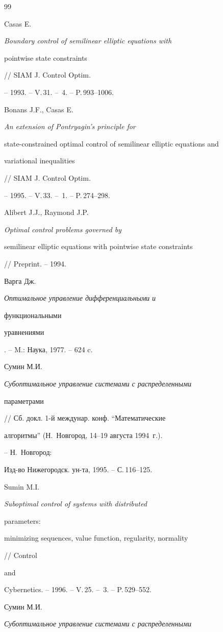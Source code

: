 \begin{thebibliography}{99}


Casas E. {\em Boundary control of semilinear elliptic equations with 


pointwise state constraints} // SIAM J. Control Optim. 


-- 1993. -- V.\,31. -- \No\,4. -- P.\,993--1006. 




Bonans J.F., Casas E. {\em An extension of Pontryagin's principle for 


state-constrained optimal control of semilinear elliptic equations and 


variational inequalities} // SIAM J. Control Optim. 


-- 1995. -- V.\,33. -- \No\,1. -- P.\,274--298. 




Alibert J.J., Raymond J.P. {\em Optimal control problems governed by 


semilinear elliptic equations with pointwise state constraints} 


// Preprint. -- 1994. 




Варга Дж. {\em Оптимальное управление дифференциальными и 


функциональными 


уравнениями}. -- M.: Наука, 1977. -- 624 c. 




Сумин М.И. {\em Субоптимальное управление системами с распределенными 


параметрами} // Сб. докл. 1-й междунар. конф. ``Математические 


алгоритмы'' (Н.~Новгород, 14--19 августа 1994~г.). 


-- Н.~Новгород: 


Изд-во Нижегородск. ун-та, 1995. -- С.\,116--125. 




Sumin M.I. {\em Suboptimal control of systems with distributed 


parameters$:$ 


minimizing sequences, value function, regularity, normality} // Control 


and 


Cybernetics. -- 1996. -- V.\,25. -- \No\,3. -- P.\,529--552. 




Сумин М.И. {\em Субоптимальное управление системами с распределенными 


}
\end{thebibliography}
